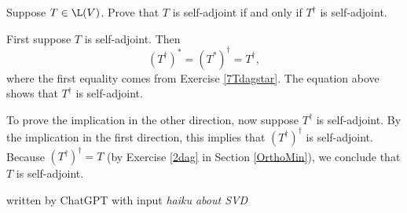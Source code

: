 \exercise
Suppose $T \in \L(V)$. Prove that $T$ is self-adjoint if and only if $T^\dagger$ is self-adjoint.

\begin{Solution}
First suppose $T$ is self-adjoint. Then
\[
{(T^\dagger)}^* = {(T^*)}^\dagger = T^\dagger,
\]
where the first equality comes from Exercise \ref{7Tdagstar}. The equation above shows that $T^\dagger$ is self-adjoint.

To prove the implication in the other direction, now suppose $T^\dagger$ is self-adjoint. By the implication in the first direction, this implies that ${(T^\dagger)}^\dagger$ is self-adjoint. Because ${(T^\dagger)}^\dagger = T$ (by Exercise \ref{2dag} in Section \ref{OrthoMin}), we conclude that $T$ is self-adjoint.
\end{Solution}

{written by ChatGPT with input \textit{haiku about SVD}}

